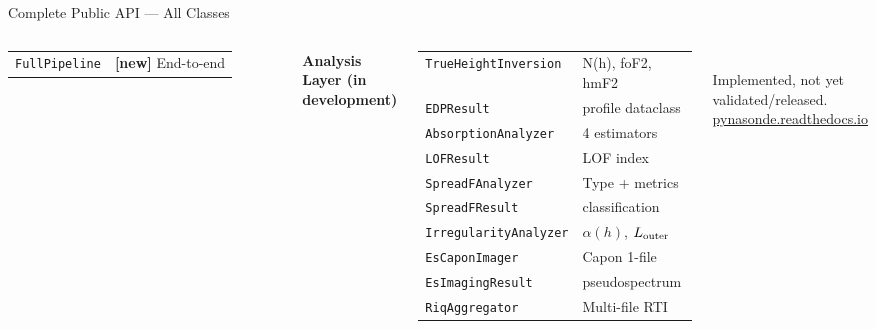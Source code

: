 \documentclass[aspectratio=169,11pt]{beamer}
\begin{document}
\begin{frame}{Complete Public API — All Classes}
\begin{columns}
\begin{tabular}{ll}
    \texttt{FullPipeline}   & \textbf{[new]} End-to-end \\
  \end{tabular}
  \small\textbf{Analysis Layer \textcolor{orange!80!black}{(in development)}}\\[2pt]
  \scriptsize
  \begin{tabular}{ll}
    \texttt{TrueHeightInversion}    & N(h), foF2, hmF2 \\
    \texttt{EDPResult}              & profile dataclass \\
    \texttt{AbsorptionAnalyzer}     & 4 estimators \\
    \texttt{LOFResult}              & LOF index \\
    \texttt{SpreadFAnalyzer}        & Type + metrics \\
    \texttt{SpreadFResult}          & classification \\
    \texttt{IrregularityAnalyzer}   & $\alpha(h)$, $L_{\rm outer}$ \\
    \texttt{EsCaponImager}          & Capon 1-file \\
    \texttt{EsImagingResult}        & pseudospectrum \\
    \texttt{RiqAggregator}          & Multi-file RTI \\
  \end{tabular}\\[4pt]
  {\scriptsize\color{orange!80!black} Implemented, not yet validated/released.}\\[6pt]
  \href{https://pynasonde.readthedocs.io}{\small pynasonde.readthedocs.io}
\end{columns}
\end{frame}
\end{document}
